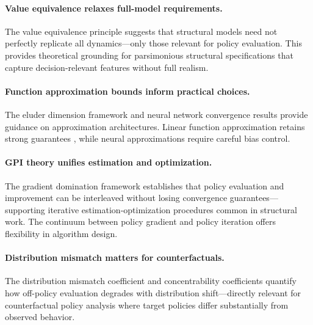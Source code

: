 \paragraph{Value equivalence relaxes full-model requirements.} The value equivalence principle \citep{grimm2020value} suggests that structural models need not perfectly replicate all dynamics---only those relevant for policy evaluation. This provides theoretical grounding for parsimonious structural specifications that capture decision-relevant features without full realism.

\paragraph{Function approximation bounds inform practical choices.} The eluder dimension framework \citep{wang2020eluder} and neural network convergence results \citep{fan2020dqn,gaur2023fqi} provide guidance on approximation architectures. Linear function approximation retains strong guarantees \citep{bhandari2021finite}, while neural approximations require careful bias control.

\paragraph{GPI theory unifies estimation and optimization.} The gradient domination framework establishes that policy evaluation and improvement can be interleaved without losing convergence guarantees---supporting iterative estimation-optimization procedures common in structural work. The continuum between policy gradient and policy iteration \citep{xiao2022convergence} offers flexibility in algorithm design.

\paragraph{Distribution mismatch matters for counterfactuals.} The distribution mismatch coefficient \citep{agarwal2021theory} and concentrability coefficients \citep{li2024offline} quantify how off-policy evaluation degrades with distribution shift---directly relevant for counterfactual policy analysis where target policies differ substantially from observed behavior.